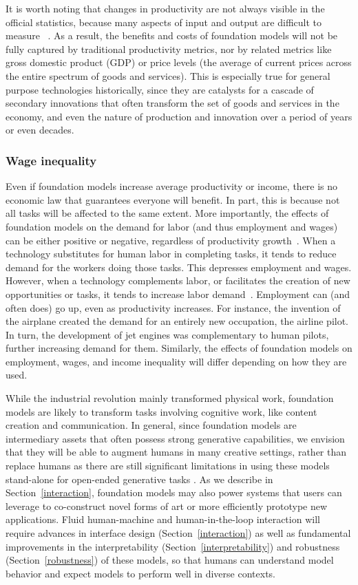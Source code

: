It is worth noting that changes in productivity are not always visible in the official statistics, because many aspects of input and output are difficult to measure ~\citep{BrynjolfssonErik2019Hswm}. As a result, the benefits and costs of foundation models will not be fully captured by traditional productivity metrics, nor by related metrics like gross domestic product (GDP) or price levels (the average of current prices across the entire spectrum of goods and services). This is especially true for general purpose technologies historically, since they are catalysts for a cascade of secondary innovations that often transform the set of goods and services in the economy, and even the nature of production and innovation over a period of years or even decades.

\subsubsection{Wage inequality} Even if foundation models increase average productivity or income, there is no economic law that guarantees everyone will benefit. In part, this is because not all tasks will be affected to the same extent. More importantly, the effects of foundation models on the demand for labor (and thus employment and wages) can be either positive or negative, regardless of productivity growth~\citep{brynolfsson2011race,brynjolfsson2017can}. When a technology substitutes for human labor in completing tasks, it tends to reduce demand for the workers doing those tasks. This depresses employment and wages. However, when a technology complements labor, or facilitates the creation of new opportunities or tasks, it tends to increase labor demand~\citep{acemoglu2019automation}. Employment can (and often does) go up, even as productivity increases. For instance, the invention of the airplane created the demand for an entirely new occupation, the airline pilot. In turn, the development of jet engines was complementary to human pilots, further increasing demand for them. Similarly, the effects of foundation models on employment, wages, and income inequality will differ depending on how they are used.

While the industrial revolution mainly transformed physical work, foundation models are likely to transform tasks involving cognitive work, like content creation and communication. In general, since foundation models are intermediary assets that often possess strong generative capabilities, we envision that they will be able to augment humans in many creative settings, rather than replace humans as there are still significant limitations in using these models stand-alone for open-ended generative tasks \citep{see2019}. As we describe in Section~\ref{interaction}, foundation models may also power systems that users can leverage to co-construct novel forms of art or more efficiently prototype new applications. Fluid human-machine and human-in-the-loop interaction will require advances in interface design (Section~\ref{interaction}) as well as fundamental improvements in the interpretability (Section~\ref{interpretability}) and robustness (Section~\ref{robustness}) of these models, so that humans can understand model behavior and expect models to perform well in diverse contexts.

